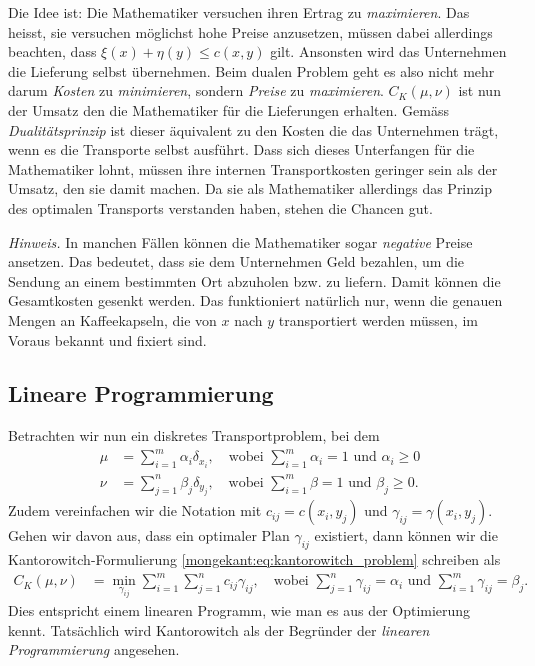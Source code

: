 Die Idee ist:
Die Mathematiker versuchen ihren Ertrag zu \emph{maximieren}.
%
Das heisst,
sie versuchen möglichst hohe Preise anzusetzen,
müssen dabei allerdings beachten,
dass $\xi(x)+\eta(y) \leq c(x,y)$ gilt.
Ansonsten wird das Unternehmen die Lieferung selbst übernehmen.
Beim dualen Problem geht es also nicht mehr darum \emph{Kosten} zu \emph{minimieren},
sondern \emph{Preise} zu \emph{maximieren}.
$C_K(\mu,\nu)$ ist nun der Umsatz den die Mathematiker für die Lieferungen erhalten.
Gemäss \emph{Dualitätsprinzip} ist dieser äquivalent zu den Kosten die das Unternehmen trägt,
%
wenn es die Transporte selbst ausführt.
Dass sich dieses Unterfangen für die Mathematiker lohnt,
müssen ihre internen Transportkosten geringer sein als der Umsatz,
den sie damit machen.
Da sie als Mathematiker allerdings das Prinzip des optimalen Transports verstanden haben,
stehen die Chancen gut.

\emph{Hinweis.}
In manchen Fällen können die Mathematiker sogar \emph{negative} Preise ansetzen.
Das bedeutet,
dass sie dem Unternehmen Geld bezahlen,
um die Sendung an einem bestimmten Ort abzuholen bzw. zu liefern.
Damit können die Gesamtkosten gesenkt werden.
Das funktioniert natürlich nur,
wenn die genauen Mengen an Kaffeekapseln,
die von $x$ nach $y$ transportiert werden müssen,
im Voraus bekannt und fixiert sind.

\subsection{Lineare Programmierung%
\label{mongekant:subsection:linear_programming}}

Betrachten wir nun ein diskretes Transportproblem,
bei dem
\begin{align*}
\mu
&=
\sum_{i=1}^m \alpha_i \delta_{x_i}
,\quad\text{wobei }
\sum_{i=1}^m \alpha_i = 1
\text{ und }
\alpha_i \geq 0
\\
\nu
&=
\sum_{j=1}^n \beta_j \delta_{y_j}
,\quad\text{wobei }
\sum_{i=1}^m \beta = 1
\text{ und }
\beta_j \geq 0
.
\end{align*}
Zudem vereinfachen wir die Notation mit $c_{ij} = c(x_i, y_j)$ und
$\gamma_{ij} = \gamma(x_i, y_j)$.
Gehen wir davon aus,
dass ein optimaler Plan $\gamma_{ij}$ existiert,
dann können wir die Kantorowitch-For\-mu\-lie\-rung \eqref{mongekant:eq:kantorowitch_problem} schreiben als
\begin{align*}
C_K(\mu, \nu)
&=
\min_{\gamma_{ij}}
\sum_{i=1}^m \sum_{j=1}^n c_{ij} \gamma_{ij}
,\quad
\text{wobei }
\sum_{j=1}^n \gamma_{ij} = \alpha_i
\text{ und }
\sum_{i=1}^m \gamma_{ij} = \beta_j
.
\end{align*}
Dies entspricht einem linearen Programm,
wie man es aus der Optimierung kennt.
Tatsächlich wird Kantorowitch als der Begründer der \emph{linearen Programmierung} angesehen.
